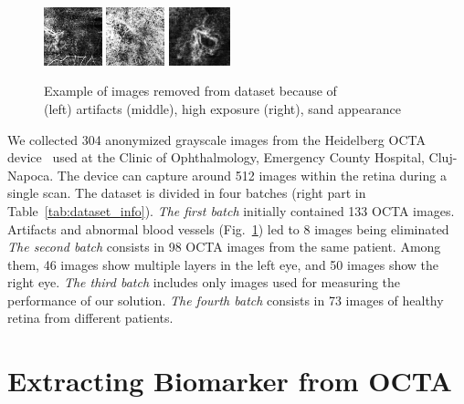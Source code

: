 \documentclass[conference]{IEEEtran}
\begin{document}
\begin{figure}%
    \centering
    \includegraphics[width=0.15\textwidth]{fig/artifacts.png}
    \includegraphics[width=0.15\textwidth]{fig/exposure.png}
    \includegraphics[width=0.16\textwidth]{fig/sand.png}
    \caption{Example of images removed from dataset because of \\ (left) artifacts (middle), high exposure (right), sand appearance}
    \label{fig:notgood_batch1}
\end{figure}
We collected 304 anonymized grayscale images from the Heidelberg OCTA device~\cite{soomro2018use} used at the Clinic of Ophthalmology, Emergency County Hospital, Cluj-Napoca. The device can capture around 512 images within the retina during a single scan. The dataset is divided in four batches (right part in Table~\ref{tab:dataset_info}).
\textit{The first batch} initially contained 133 OCTA images. 
Artifacts and abnormal blood vessels (Fig.~\ref{fig:notgood_batch1}) led to 8 images being eliminated 
\textit{The second batch} consists in 98 OCTA images from the same patient. 
Among them, 46 images show multiple layers in the left eye, and 50 images show the right eye.
\textit{The third batch} includes only images used for measuring the performance of our solution. 
\textit{The fourth batch} consists in 73 images of healthy retina from different patients. 


\section{Extracting Biomarker from OCTA} 
\end{document}
